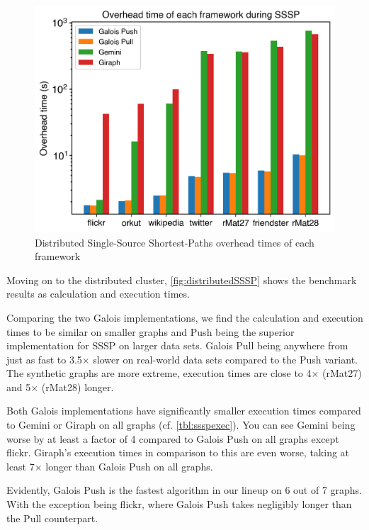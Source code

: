 \begin{figure}
	\centering
	\includegraphics[width=\linewidth]{../../plots/distributedSSSP_overheadTime.png}
	\caption{Distributed Single-Source Shortest-Paths overhead times of each framework}
	\label{fig:distributedSSSP_overhead}
\end{figure}

Moving on to the distributed cluster, \autoref{fig:distributedSSSP} shows the benchmark results as calculation and execution times.

Comparing the two Galois implementations, we find the calculation and execution times to be similar on smaller graphs and Push being the superior implementation for SSSP on larger data sets. Galois Pull being anywhere from just as fast to 3.5$\times$ slower on real-world data sets compared to the Push variant. The synthetic graphs are more extreme, execution times are close to 4$\times$ (rMat27) and 5$\times$ (rMat28) longer.

Both Galois implementations have significantly smaller execution times compared to Gemini or Giraph on all graphs (cf. \autoref{tbl:ssspexec}).
You can see Gemini being worse by at least a factor of 4 compared to Galois Push on all graphs except flickr.
Giraph's execution times in comparison to this are even worse, taking at least 7$\times$ longer than Galois Push on all graphs.

Evidently, Galois Push is the fastest algorithm in our lineup on 6 out of 7 graphs. With the exception being flickr, where Galois Push takes negligibly longer than the Pull counterpart.



